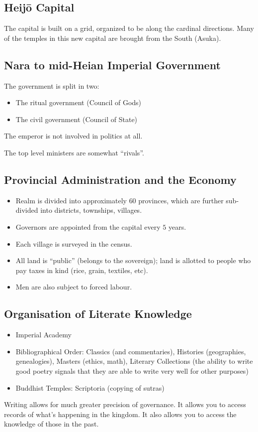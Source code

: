 \documentclass[class=article, crop=false]{standalone}
\begin{document}
  \subsection{Heij\=o Capital}
  The capital is built on a grid, organized to be along the cardinal directions. Many of the temples in this new capital are brought from the South (Asuka).
  \subsection{Nara to mid-Heian Imperial Government}
  The government is split in two:
  \begin{itemize}
    \item The ritual government (Council of Gods)
    \item The civil government (Council of State)
  \end{itemize}
  \begin{note}{}
    The emperor is not involved in politics at all.
  \end{note}
  The top level ministers are somewhat ``rivals''.
  \subsection{Provincial Administration and the Economy}
  \begin{itemize}
    \item Realm is divided into approximately $60$ provinces, which are further sub-divided into districts, townships, villages.
    \item Governors are appointed from the capital every $5$ years.
    \item Each village is surveyed in the census.
    \item All land is ``public'' (belongs to the sovereign); land is allotted to people who pay taxes in kind (rice, grain, textiles, etc).
    \item Men are also subject to forced labour.
  \end{itemize}
  \subsection{Organisation of Literate Knowledge}
  \begin{itemize}
    \item Imperial Academy
    \item Bibliographical Order: Classics (and commentaries), Histories (geographies, genealogies), Masters (ethics, math), Literary Collections (the ability to write good poetry signals that they are able to write very well for other purposes)
    \item Buddhist Temples: Scriptoria (copying of sutras)
  \end{itemize}
  \begin{note}{}
    Writing allows for much greater precision of governance. It allows you to access records of what's happening in the kingdom. It also allows you to access the knowledge of those in the past.
  \end{note}
\end{document}
